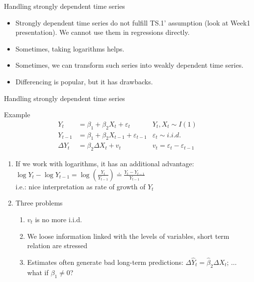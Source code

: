 \documentclass[usenames,dvipsnames]{beamer}
\begin{document}
\begin{frame}{Handling strongly dependent time series}
\begin{itemize}
\item Strongly dependent time series do not fulfill TS.1' assumption (look at Week1 presentation). We cannot use them in regressions directly.
\vspace{0.5cm}
\item Sometimes, taking logarithms helps.
\vspace{0.5cm}
\item Sometimes, we can transform such series into weakly dependent time series.
\vspace{0.5cm}
\item Differencing is popular, but it has drawbacks.
\end{itemize}
\end{frame}

\begin{frame}{Handling strongly dependent time series}
\begin{block}{Example}
\begin{align} 
Y_t & = \beta_1 + \beta_2 X_t + \varepsilon_t & Y_t, X_t \sim I(1) \\
Y_{t-1} & = \beta_1 + \beta_2 X_{t-1} + \varepsilon_{t-1} & \varepsilon_t \sim i.i.d. \\
\Delta Y_t & = \beta_2\Delta X_t + v_t  & v_t= \varepsilon_t - \varepsilon_{t-1}
\end{align}
\end{block}
\begin{enumerate}
\item If we work with logarithms, it has an additional advantage: \\
$\log Y_t - \log Y_{t-1} = \log \left( \frac{Y_t}{Y_{t-1}} \right) \doteq\frac{Y_t - Y_{t-1}}{Y_{t-1}}$ \\ 
i.e.: nice interpretation as rate of growth of $Y_t$
\item Three problems 
\begin{enumerate}
\item $v_t$ is no more i.i.d.
\item We loose information linked with the levels of variables, short term relation are stressed
\item Estimates often generate bad long-term predictions: 
$ \Delta \hat{Y}_t = \hat{\beta}_2 \Delta X_t$; $ \dots $ what if $\beta_1 \neq 0$? 
\end{enumerate}
\end{enumerate}
\end{frame}
\end{document}
